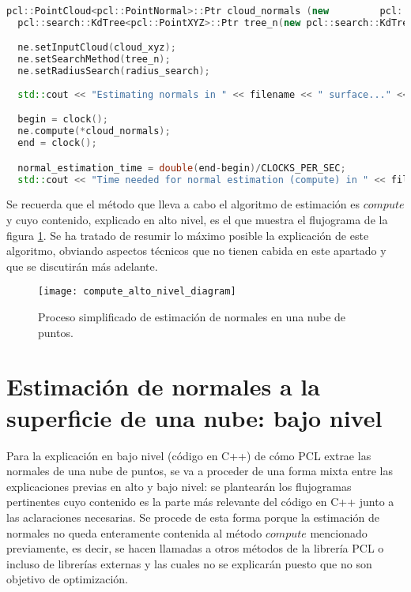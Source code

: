 \begin{lstlisting}[language=C++,breaklines]
  pcl::PointCloud<pcl::PointNormal>::Ptr cloud_normals (new 		pcl::PointCloud<pcl::PointNormal>);
  pcl::search::KdTree<pcl::PointXYZ>::Ptr tree_n(new pcl::search::KdTree<pcl::PointXYZ>());

  ne.setInputCloud(cloud_xyz);
  ne.setSearchMethod(tree_n);
  ne.setRadiusSearch(radius_search);
 
  std::cout << "Estimating normals in " << filename << " surface..." <<std::endl;

  begin = clock();
  ne.compute(*cloud_normals);
  end = clock();

  normal_estimation_time = double(end-begin)/CLOCKS_PER_SEC;
  std::cout << "Time needed for normal estimation (compute) in " << filename << ": " << normal_estimation_time << " seconds" << std::endl << std::endl;
\end{lstlisting}

Se recuerda que el método que lleva a cabo el algoritmo de estimación es $compute$ y cuyo contenido, explicado en alto nivel, es el que muestra el flujograma de la figura \ref{fig:compute_alto_nivel_diagram}.
Se ha tratado de resumir lo máximo posible la explicación de este algoritmo, obviando aspectos técnicos que no tienen cabida en este apartado y que se discutirán más adelante. 

\begin{figure}[!htb]
\centering
{}
  \texttt{[image: compute\_alto\_nivel\_diagram]}
  \caption{Proceso simplificado de estimación de normales en una nube de puntos.}\label{fig:compute_alto_nivel_diagram}
\endminipage\hfill

\end{figure}

\section{Estimación de normales a la superficie de una nube: bajo nivel}
Para la explicación en bajo nivel (código en C++) de cómo PCL extrae las normales de una nube de puntos, se va a proceder de una forma mixta entre las explicaciones previas en alto y bajo nivel: se plantearán los flujogramas pertinentes cuyo contenido es la parte más relevante del código en C++ junto a las aclaraciones necesarias. Se procede de esta forma porque la estimación de normales no queda enteramente contenida al método $compute$ mencionado previamente, es decir, se hacen llamadas a otros métodos de la librería PCL o incluso de librerías externas y las cuales no se explicarán puesto que no son objetivo de optimización.


